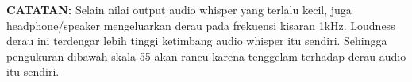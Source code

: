 \documentclass[12pt,]{article}
\begin{document}
	\color{red} \textbf{CATATAN:}
	Selain nilai output audio whisper yang terlalu kecil,
	juga headphone/speaker mengeluarkan derau pada frekuensi kisaran 1kHz.
	Loudness derau ini terdengar lebih tinggi ketimbang audio whisper itu sendiri.
	Sehingga pengukuran dibawah skala 55 akan rancu karena tenggelam terhadap derau audio itu sendiri.
\end{document}
